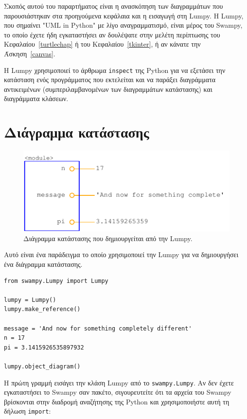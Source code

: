 \documentclass[10pt]{book}
\begin{document}
Σκοπός αυτού του παραρτήματος είναι η ανασκόπηση των διαγραμμάτων που παρουσιάστηκαν στα προηγούμενα κεφάλαια
και η εισαγωγή στη Lumpy.  Η Lumpy, που σημαίνει "UML in Python" με λίγο αναγραμματισμό, είναι μέρος του
Swampy, το οποίο έχετε ήδη εγκαταστήσει αν δουλέψατε στην μελέτη περίπτωσης του Κεφαλαίου~\ref{turtlechap}
ή του Κεφαλαίου~\ref{tkinter}, ή αν κάνατε την Άσκηση~\ref{canvas}.

Η Lumpy χρησιμοποιεί το άρθρωμα {\tt inspect} της Python για να εξετάσει την κατάσταση ενός προγράμματος
που εκτελείται και να παράξει διαγράμματα αντικειμένων (συμπεριλαμβανομένων των διαγραμμάτων κατάστασης)
και διαγράμματα κλάσεων.


\section{Διάγραμμα κατάστασης}

\begin{figure}
\centerline
{\includegraphics[scale=0.7]{figs/lumpydemo1.pdf}}
\caption{Διάγραμμα κατάστασης που δημιουργείται από την  Lumpy.} 
\label{fig.lumpy1}
\end{figure}

Αυτό είναι ένα παράδειγμα το οποίο χρησιμοποιεί την Lumpy για να δημιουργήσει ένα διάγραμμα κατάστασης.
  

\begin{verbatim}
from swampy.Lumpy import Lumpy

lumpy = Lumpy()
lumpy.make_reference()

message = 'And now for something completely different'
n = 17
pi = 3.1415926535897932

lumpy.object_diagram()
\end{verbatim}

Η πρώτη γραμμή εισάγει την κλάση Lumpy από το {\tt swampy.Lumpy}. Αν δεν έχετε εγκαταστήσει το Swampy
σαν πακέτο, σιγουρευτείτε ότι τα αρχεία του Swampy βρίσκονται στην διαδρομή αναζήτησης της Python και
χρησιμοποιήστε αυτή τη δήλωση {\tt import}:
\end{document}
